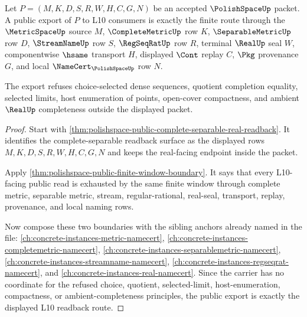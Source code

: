 \begin{theorem}
\label{thm:polishspace-public-readback-export}
Let $P=(M,K,D,S,R,W,H,C,G,N)$ be an accepted $\PolishSpaceUp$ packet. A public export of $P$ to L10 consumers is exactly the finite route through the $\MetricSpaceUp$ source $M$, $\CompleteMetricUp$ row $K$, $\SeparableMetricUp$ row $D$, $\StreamNameUp$ row $S$, $\RegSeqRatUp$ row $R$, terminal $\RealUp$ seal $W$, componentwise $\hsame$ transport $H$, displayed $\Cont$ replay $C$, $\Pkg$ provenance $G$, and local $\NameCert_{\PolishSpaceUp}$ row $N$.

The export refuses choice-selected dense sequences, quotient completion equality, selected limits, host enumeration of points, open-cover compactness, and ambient $\RealUp$ completeness outside the displayed packet.
\end{theorem}
\begin{proof}
Start with \autoref{thm:polishspace-public-complete-separable-real-readback}. It identifies the complete-separable readback surface as the displayed rows $M,K,D,S,R,W,H,C,G,N$ and keeps the real-facing endpoint inside the packet.

Apply \autoref{thm:polishspace-public-finite-window-boundary}. It says that every L10-facing public read is exhausted by the same finite window through complete metric, separable metric, stream, regular-rational, real-seal, transport, replay, provenance, and local naming rows.

Now compose these two boundaries with the sibling anchors already named in the file: \autoref{ch:concrete-instances-metric-namecert}, \autoref{ch:concrete-instances-completemetric-namecert}, \autoref{ch:concrete-instances-separablemetric-namecert}, \autoref{ch:concrete-instances-streamname-namecert}, \autoref{ch:concrete-instances-regseqrat-namecert}, and \autoref{ch:concrete-instances-real-namecert}. Since the carrier has no coordinate for the refused choice, quotient, selected-limit, host-enumeration, compactness, or ambient-completeness principles, the public export is exactly the displayed L10 readback route.
\end{proof}

